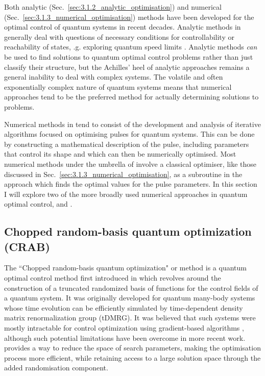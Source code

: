 Both analytic (Sec.~\ref{sec:3.1.2_analytic_optimisation}) and numerical (Sec.~\ref{sec:3.1.3_numerical_optimisation}) methods have been developed for the optimal control of quantum systems in recent decades. Analytic methods in  generally deal with questions of necessary conditions for controllability \cite{schirmer_complete_2001} or reachability of states, \@e.g. exploring quantum speed limits \cite{khaneja_time_2001, hegerfeldt_driving_2013, poggi_quantum_2013}. Analytic methods \emph{can} be used to find solutions to quantum optimal control problems rather than just classify their structure, but the Achilles' heel of analytic approaches remains a general inability to deal with complex systems. The volatile and often exponentially complex nature of quantum systems means that numerical approaches tend to be the preferred method for actually determining solutions to  problems. 

Numerical methods in  tend to consist of the development and analysis of iterative algorithms focused on optimising pulses for quantum systems. This can be done by constructing a mathematical description of the pulse, including parameters that control its shape and which can then be numerically optimised. Most numerical methods under the umbrella of  involve a classical optimiser, like those discussed in Sec.~\ref{sec:3.1.3_numerical_optimisation}, as a subroutine in the approach which finds the optimal values for the pulse parameters. In this section I will explore two of the more broadly used numerical approaches in quantum optimal control,  and . 

\subsection{Chopped random-basis quantum optimization (CRAB)}\label{sec:3.3.1_CRAB}

The ``Chopped random-basis quantum optimization" or  method is a quantum optimal control method first introduced in \cite{doria_optimal_2011, caneva_chopped_2011} which revolves around the construction of a truncated randomized basis of functions for the control fields of a quantum system. It was originally developed for quantum many-body systems whose time evolution can be efficiently simulated by time-dependent density matrix renormalization group (tDMRG)\cite{white_density_1992, schollwock_density-matrix_2005, schollwock_density-matrix_2011}. It was believed that such systems were mostly intractable for control optimization using gradient-based algorithms \cite{brif_control_2010}, although such potential limitations have been overcome in more recent work\cite{jensen_approximate_2021}.  provides a way to reduce the space of search parameters, making the optimisation process more efficient, while retaining access to a large solution space through the added randomisation component.

